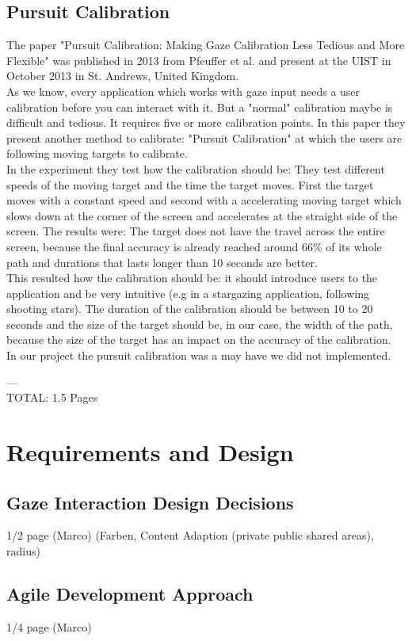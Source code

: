 \documentclass{sigchi}
\begin{document}
\subsection{Pursuit Calibration}
The paper "Pursuit Calibration: Making Gaze Calibration Less Tedious and More Flexible" was published in 2013 from Pfeuffer et al. and present at the UIST in October 2013 in St. Andrews, United Kingdom.\\
As we know, every application which works with gaze input needs a user calibration before you can interact with it. But a "normal" calibration maybe is difficult and tedious. It requires five or more calibration points. In this paper they present another method to calibrate: "Pursuit Calibration" at which the users are following moving targets to calibrate.\\
In the experiment they test how the calibration should be: They test different speeds of the moving target and the time the target moves. First the target moves with a constant speed and second with a accelerating moving target which slows down at the corner of the screen and accelerates at the straight side of the screen. The results were: The target does not have the travel across the entire screen, because the final accuracy is already reached around 66\% of its whole path and durations that lasts longer than 10 seconds are better.\\
This resulted how the calibration should be: it should introduce users to the application and be very intuitive (e.g in a stargazing application, following shooting stars). The duration of the calibration should be between 10 to 20 seconds and the size of the target should be, in our case, the width of the path, because the size of the target has an impact on the accuracy of the calibration.\\
In our project the pursuit calibration was a may have we did not implemented.

---\\
TOTAL: 1.5 Pages

\section{Requirements and Design}
\subsection{Gaze Interaction Design Decisions}
1/2 page (Marco) (Farben, Content Adaption (private public shared areas), radius)
\subsection{Agile Development Approach}
1/4 page (Marco)
\end{document}
